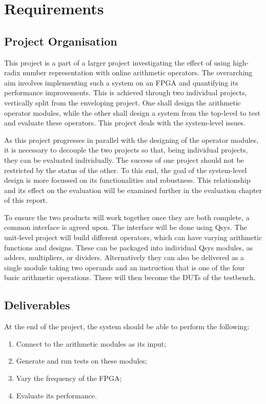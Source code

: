 \section{Requirements}

\subsection{Project Organisation}
This project is a part of a larger project investigating the effect of using
high-radix number representation with online arithmetic operators.
The overarching aim involves implementing such a system on an FPGA and
quantifying its performance improvements.
This is achieved through two individual projects, vertically split from
the enveloping project.
One shall design the arithmetic operator modules,
while the other shall design a system from the top-level to test and
evaluate these operators.
This project deals with the system-level issues.

As this project progresses in parallel with the designing of the operator
modules, it is necessary to decouple the two projects so that, being individual
projects, they can be evaluated individually.
The success of one project should not be restricted by the status of the other.
To this end, the goal of the system-level design is more focussed on its
functionalities and robustness.
This relationship and its effect on the evaluation will be examined further in
the evaluation chapter of this report.

To ensure the two products will work together once they are both complete, a
common interface is agreed upon.
The interface will be done using Qsys.
The unit-level project will build different operators, which can have varying
arithmetic functions and designs.
These can be packaged into individual Qsys modules, as adders, multipliers,
or dividers.
Alternatively they can also be delivered as a single module taking two operands
and an instruction that is one of the four basic arithmetic operations.
These will then become the DUTs of the testbench.

\subsection{Deliverables}
At the end of the project, the system should be able to perform the following:
\begin{enumerate}
  \item Connect to the arithmetic modules as its input;
  \item Generate and run tests on these modules;
  \item Vary the frequency of the FPGA;
  \item Evaluate its performance.
\end{enumerate}


